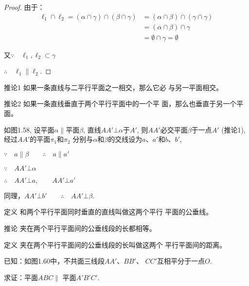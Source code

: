 \begin{proof}
由于：
\[\begin{split}
  \ell_1\cap \ell_2=(\alpha\cap \gamma)\cap (\beta\cap \gamma)&=(\alpha\cap \beta)\cap (\gamma\cap \gamma)\\
  &=(\alpha\cap \beta)\cap \gamma\\
  &=\emptyset\cap\gamma=\emptyset
\end{split}\]

又$\because\quad \ell_1,\ell_2\subset\gamma$

$\therefore\quad\ell_1\parallel \ell_2$.
\end{proof}

\begin{blk}
  {推论1} 如果一条直线与二平行平面之一相交，那么它必
与另一平面相交。
\end{blk}


\begin{blk}
  {推论2} 如果一条直线垂直于两个平行平面中的一个平
面，那么也垂直于另一个平面。
\end{blk}

如图1.58, 设平面$\alpha\parallel$平面$\beta$, 直线$AA'\bot\alpha$于$A'$, 则$AA'$必交平面$\beta$于一点$A'$ (推论1), 经过$AA'$的平面$\pi_1$和$\pi_2$
分别与$\alpha$和$\beta$的交线设为$a$、$a'$和$b$、$b'$,

$\because\quad a\parallel \beta \qquad \therefore\quad a\parallel a'$

$\because\quad AA'\bot \alpha$

$\therefore\quad AA'\bot a,\quad \quad AA'\bot a'$

同理，$AA'\bot b'\qquad \therefore\quad AA'\bot\beta$.



\begin{blk}
  {定义} 和两个平行平面同时垂直的直线叫做这两个平行
平面的公垂线。
\end{blk}


\begin{blk}
  {推论} 夹在两个平行平面间的公垂线段的长都相等。
\end{blk}


\begin{blk}
{定义} 夹在两个平行平面间的公垂线段的长叫做这两个
平行平面间的距离。
  \end{blk}

\begin{example}
  已知：如图1.60中，不共面三线段$AA'$、$BB'$、
  $CC'$互相平分于一点$O$.

  求证：平面$ABC\parallel$ 平面$A'B'C'$.
\end{example}

